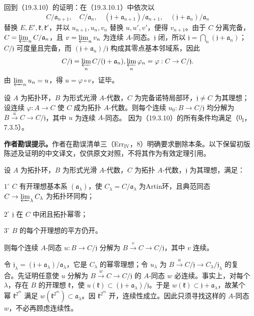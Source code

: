 回到（19.3.10）的证明：在（19.3.10.1）中依次以
\[
 C/\mathfrak a_{n+1},\quad C/\mathfrak a_n,\quad
 (\mathfrak j+\mathfrak a_{n+1})/\mathfrak a_{n+1},\quad
 (\mathfrak j+\mathfrak a_n)/\mathfrak a_n
\]
替换 $E,E',\mathfrak k,\mathfrak k'$，并以 $u_{n+1},u_n,v_n$ 替换 $u,u',v'$，便得 $v_{n+1}$。由于 $C$ 分离完备，$C=\varprojlim_n C/\mathfrak a_n$，且 $v=\varprojlim_n v_n$ 为连续 $A$-同态。$\mathfrak j$ 闭，所以 $\mathfrak j=\bigcap_n(\mathfrak j+\mathfrak a_n)$；$C/\mathfrak j$ 可度量且完备，而 $(\mathfrak j+\mathfrak a_n)/\mathfrak j$ 构成其零点基本邻域系，因此
\[
 C/\mathfrak j=\varprojlim_n C/(\mathfrak j+\mathfrak a_n),
 \qquad \varprojlim_n\varphi_n=\varphi:C\to C/\mathfrak j.
\]
由 $\varprojlim_nu_n=u$，得 $u=\varphi\circ v$，证毕。

设 $A$ 为拓扑环，$B$ 为形式光滑 $A$-代数，$C$ 为完备诺特局部环，$\mathfrak j\ne C$ 为其理想；设连续 $\varphi:A\to C$ 使 $C$ 成为拓扑 $A$-代数。则每个连续 $u_0:B\to C/\mathfrak j$ 均分解为 $B\xrightarrow{u}C\to C/\mathfrak j$，其中 $u$ 为连续 $A$-同态。
因为（19.3.10）的所有条件均满足（$0_{\mathrm I}$，7.3.5）。

\noindent\textbf{作者勘误提示。}作者在勘误清单三（Err$_{\mathrm{IV}}$，8）明确要求删除本条。以下保留初版陈述及证明的中文译文，仅供原文对照，不将其作为有效定理引用。

设 $A$ 为拓扑环，$B$ 为形式光滑 $A$-代数，$C$ 为拓扑 $A$-代数，$\mathfrak j$ 为其理想，满足：

$1^\circ$ $C$ 有开理想基本系 $(\mathfrak a_\lambda)$，使 $C_\lambda=C/\mathfrak a_\lambda$ 为Artin环，且典范同态 $C\to\varprojlim_\lambda C_\lambda$ 为拓扑环同构；

$2^\circ$ $\mathfrak j$ 在 $C$ 中闭且拓扑幂零；

$3^\circ$ $B$ 的每个开理想的平方仍开。

则每个连续 $A$-同态 $u:B\to C/\mathfrak j$ 分解为 $B\xrightarrow{v}C\to C/\mathfrak j$，其中 $v$ 连续。

令 $\mathfrak j_\lambda=(\mathfrak j+\mathfrak a_\lambda)/\mathfrak a_\lambda$，它是 $C_\lambda$ 的幂零理想；令 $u_\lambda$ 为 $B\xrightarrow{u}C/\mathfrak j\to C_\lambda/\mathfrak j_\lambda$ 的复合。先证明任意使 $u$ 分解为 $B\xrightarrow{w}C\to C/\mathfrak j$ 的 $A$-同态 $w$ 必连续。事实上，对每个 $\lambda$，存在 $B$ 的开理想 $\mathfrak k$，使 $u(\mathfrak k)\subset(\mathfrak j+\mathfrak a_\lambda)/\mathfrak j$。于是 $w(\mathfrak k)\subset\mathfrak j+\mathfrak a_\lambda$，故某个幂 $\mathfrak k^{2^m}$ 满足 $w(\mathfrak k^{2^m})\subset\mathfrak a_\lambda$。因 $\mathfrak k^{2^m}$ 开，连续性成立。因此只须寻找这样的 $A$-同态 $w$，不必再顾虑连续性。

